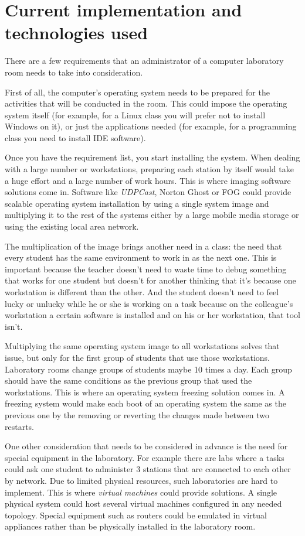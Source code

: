 \section{Current implementation and technologies used}

There are a few requirements that an administrator of a computer
laboratory room needs to take into consideration.

First of all, the computer's operating system needs to be prepared for
the activities that will be conducted in the room. This could impose the
operating system itself (for example, for a Linux class you will prefer
not to install Windows on it), or just the applications needed (for
example, for a programming class you need to install IDE software).


Once you have the requirement list, you start installing the system.
When dealing with a large number or workstations, preparing each station
by itself would take a huge effort and a large number of work hours.
This is where imaging software solutions come in. Software like
\emph{UDPCast}, Norton Ghost or FOG could provide scalable operating
system installation by using a single system image and multiplying it to
the rest of the systems either by a large mobile media storage or using
the existing local area network.

The multiplication of the image brings another need in a class: the need
that every student has the same environment to work in as the next one.
This is important because the teacher doesn't need to waste time to
debug something that works for one student but doesn't for another
thinking that it's because one workstation is different than the other.
And the student doesn't need to feel lucky or unlucky while he or she is
working on a task because on the colleague's workstation a certain
software is installed and on his or her workstation, that tool isn't.

Multiplying the same operating system image to all workstations solves
that issue, but only for the first group of students that use those
workstations. Laboratory rooms change groups of students maybe 10 times
a day. Each group should have the same conditions as the previous group
that used the workstations. This is where an operating system freezing
solution comes in. A freezing system would make each boot of an
operating system the same as the previous one by the removing or
reverting the changes made between two restarts.


One other consideration that needs to be considered in advance is the
need for special equipment in the laboratory. For example there are labs
where a tasks could ask one student to administer 3 stations that are
connected to each other by network. Due to limited physical resources,
such laboratories are hard to implement. This is where \emph{virtual
machines} could provide solutions. A single physical system could host
several virtual machines configured in any needed topology. Special
equipment such as routers could be emulated in virtual appliances rather
than be physically installed in the laboratory room.

